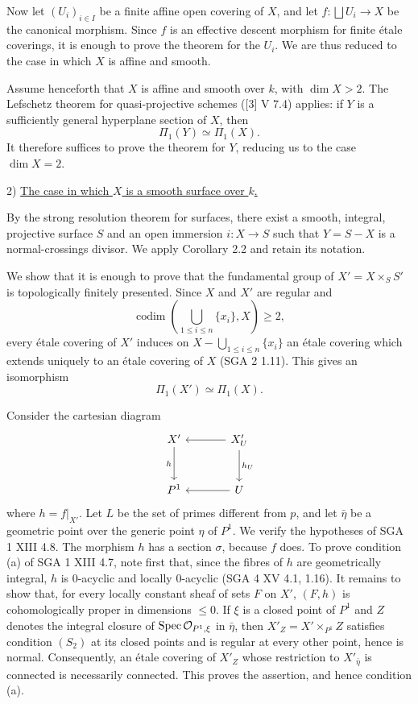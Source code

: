 Now let $(U_i)_{i\in I}$ be a finite affine open covering of $X$, and
let $f:\bigsqcup U_i\longrightarrow X$ be the canonical morphism. Since
$f$ is an effective descent morphism for finite \'etale coverings, it is
enough to prove the theorem for the $U_i$. We are thus reduced to the
case in which $X$ is affine and smooth.

Assume henceforth that $X$ is affine and smooth over $k$, with
$\dim X>2$. The Lefschetz theorem for quasi-projective schemes
([3] V 7.4) applies: if $Y$ is a sufficiently general hyperplane section
of $X$, then
\[
 \Pi_1(Y)\simeq\Pi_1(X).
\]
It therefore suffices to prove the theorem for $Y$, reducing us to the
case $\dim X=2$.

2) \underline{The case in which $X$ is a smooth surface over $k$.}

By the strong resolution theorem for surfaces, there exist a smooth,
integral, projective surface $S$ and an open immersion
$i:X\longrightarrow S$ such that $Y=S-X$ is a normal-crossings divisor.
We apply Corollary 2.2 and retain its notation.


We show that it is enough to prove that the fundamental group of
$X'=X\times_S S'$ is topologically finitely presented. Since $X$ and
$X'$ are regular and
\[
 \operatorname{codim}\!\left(\bigcup_{1\leq i\leq n}\{x_i\},X\right)
 \geq 2,
\]
every \'etale covering of $X'$ induces on
$X-\bigcup_{1\leq i\leq n}\{x_i\}$ an \'etale covering which extends
uniquely to an \'etale covering of $X$ (SGA 2 1.11). This gives an
isomorphism
\[
 \Pi_1(X')\simeq\Pi_1(X).
\]

Consider the cartesian diagram
\[
\begin{tikzcd}[column sep=large,row sep=large]
X' \arrow[d,"h"'] & X'_U \arrow[l] \arrow[d,"h_U"] \\
P^1 & U \arrow[l]
\end{tikzcd}
\]
where $h=f|_{X'}$. Let $L$ be the set of primes different from $p$, and
let $\bar\eta$ be a geometric point over the generic point $\eta$ of
$P^1$. We verify the hypotheses of SGA 1 XIII 4.8. The morphism $h$ has
a section $\sigma$, because $f$ does. To prove condition (a) of
SGA 1 XIII 4.7, note first that, since the fibres of $h$ are
geometrically integral, $h$ is $0$-acyclic and locally $0$-acyclic
(SGA 4 XV 4.1, 1.16). It remains to show that, for every locally constant
sheaf of sets $F$ on $X'$, $(F,h)$ is cohomologically proper in
dimensions $\leq 0$. If $\xi$ is a closed point of $P^1$ and $Z$ denotes
the integral closure of $\operatorname{Spec}\mathcal O_{P^1,\xi}$ in $\bar\eta$, then
$X'_Z=X'\times_{P^1}Z$ satisfies condition $(S_2)$ at its closed points
and is regular at every other point, hence is normal. Consequently, an
\'etale covering of $X'_Z$ whose restriction to $X'_{\bar\eta}$ is
connected is necessarily connected. This proves the assertion, and
hence condition (a).

